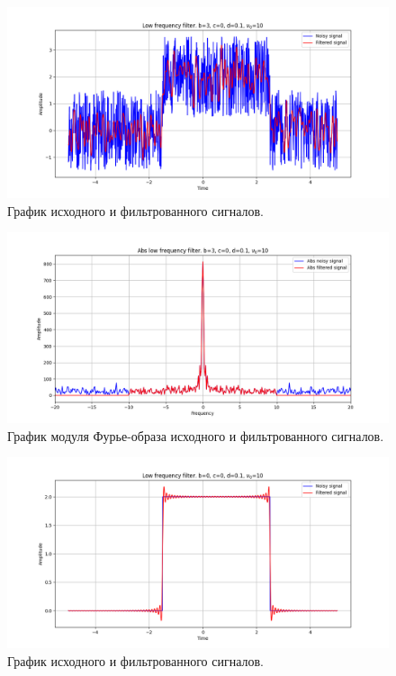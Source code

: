 \documentclass[a4paper, 12pt]{article}
\begin{document}
    \begin{figure}[!htb]
        \centering
        \includegraphics[scale=0.485]{5_u_flt_u_nohigh.png}
        \captionsetup{skip=0pt}
        \caption{График исходного и фильтрованного сигналов.}
        \label{fig:fig7}
    \end{figure}
    \begin{figure}[!htb]
        \centering
        \includegraphics[scale=0.485]{5_abs_u_U_nohigh.png}
        \captionsetup{skip=0pt}
        \caption{График модуля Фурье-образа исходного и фильтрованного сигналов.}
        \label{fig:fig8}
    \end{figure}
    \begin{figure}[!htb]
        \centering
        \includegraphics[scale=0.485]{4_u_flt_u_nohigh.png}
        \captionsetup{skip=0pt}
        \caption{График исходного и фильтрованного сигналов.}
        \label{fig:fig9}
    \end{figure}
\end{document}
